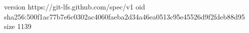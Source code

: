 version https://git-lfs.github.com/spec/v1
oid sha256:500f1ac77b7e6c0302ac4060faeba2d34a46ea0513c95e45526d9f2fdeb88d95
size 1139

